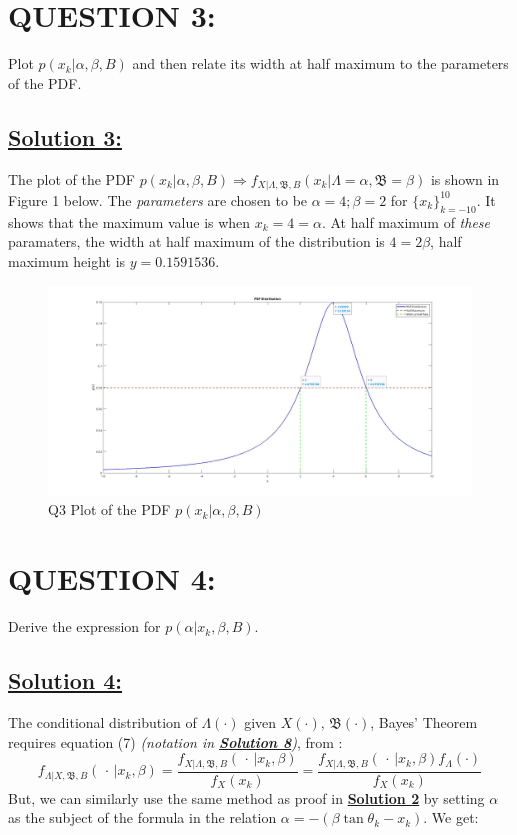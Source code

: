 \documentclass[a4paper,11pt]{article}
\begin{document}
\section{QUESTION 3:}
Plot $p(x_k | \alpha, \beta, B)$ and then relate its width at half maximum to the parameters of the PDF.

\subsection*{\underline{Solution 3:}}
The plot of the PDF $ p(x_k | \alpha, \beta, B) \Rightarrow f_{X | \Lambda, \mathfrak{B}, B}(x_k |\Lambda = \alpha, \mathfrak{B} = \beta)$ is shown in Figure 1 below. The \emph{parameters} are chosen to be $\alpha = 4; \beta = 2$ for $\{x_k \}^ {10} _{k = -10}$. It shows that the maximum value is when $x_k = 4 = \alpha$. At half maximum of \emph{these} paramaters, the width at half maximum of the distribution is $4 = 2 \beta$, half maximum height is $y = 0.1591536$.

\begin{figure}[h]
        \centering
        \includegraphics[scale=0.16]{q03pdfplot.jpg} 
        \caption{Q3 Plot of the PDF $p(x_k | \alpha, \beta, B)$}
\end{figure}


\section{QUESTION 4:}
Derive the expression for $p(\alpha | x_k, \beta, B)$.

\subsection*{\underline{Solution 4:}}
The conditional distribution of $\Lambda(\cdot)$ given $X(\cdot), \, \mathfrak{B}(\cdot)$, Bayes' Theorem requires equation (7) \emph{(notation in \hyperref[sec:notation]{\textbf{Solution 8}})}, from \cite{stanford_lecture20}:
\begin{equation}
	f_{\Lambda | X, \mathfrak{B},B} (\, \cdot \, | x_k, \beta) = \frac{f_{X | \Lambda, \mathfrak{B},B}(\, \cdot \, | x_k, \beta)}{f_X(x_k)} =
	\frac{f_{X | \Lambda, \mathfrak{B},B}(\, \cdot \, | x_k, \beta) f_\Lambda(\cdot)}{f_X(x_k)}
\end{equation}
But, we can similarly use the same method as proof in \hyperref[sec:proof]{\textbf{Solution 2}} by setting $\alpha$ as the subject of the formula in the relation $\alpha = -(\beta \tan \theta_k - x_k)$. We get:
\end{document}
